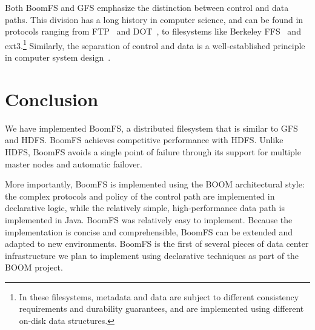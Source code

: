 \documentclass{article}
\begin{document}
Both BoomFS and GFS emphasize the distinction between control and data
paths. This division has a long history in computer science, and can
be found in protocols ranging from FTP~\cite{ftp-rfc} and
DOT~\cite{dot}, to filesystems like Berkeley FFS~\cite{ffs} and
ext3.\footnote{In these filesystems, metadata and data are subject to
  different consistency requirements and durability guarantees, and
  are implemented using different on-disk data structures.} Similarly,
the separation of control and data is a well-established principle in
computer system design~\cite{hydra-policy-mech-sep}.

\section{Conclusion}
\label{conclusion}
We have implemented BoomFS, a distributed filesystem that is similar
to GFS and HDFS. BoomFS achieves competitive performance with
HDFS. Unlike HDFS, BoomFS avoids a single point of failure through its
support for multiple master nodes and automatic failover.

More importantly, BoomFS is implemented using the BOOM architectural
style: the complex protocols and policy of the control path are
implemented in declarative logic, while the relatively simple,
high-performance data path is implemented in Java. BoomFS was
relatively easy to implement. Because the implementation is concise
and comprehensible, BoomFS can be extended and adapted to new
environments. BoomFS is the first of several pieces of data center
infrastructure we plan to implement using declarative techniques as
part of the BOOM project.



\end{document}
